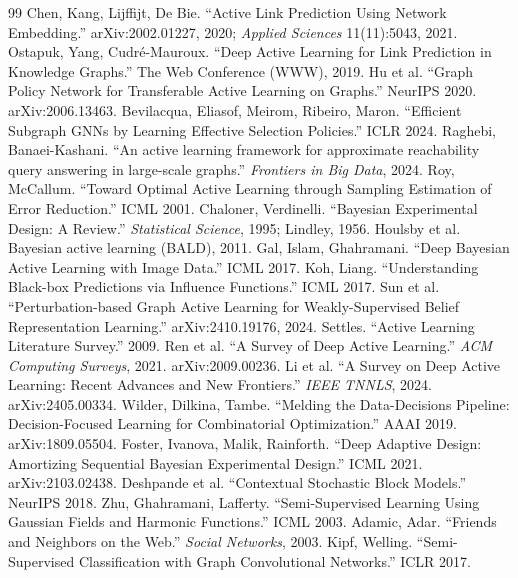 \documentclass[11pt,a4paper]{article}
\newif\ifshowverify
\newcommand{\verify}{\ifshowverify\textcolor{red}{\textsuperscript{[verify]}}\fi}
\begin{document}
\begin{thebibliography}{99}
\small
{} Chen, Kang, Lijffijt, De Bie. ``Active Link Prediction Using Network
Embedding.'' arXiv:2002.01227, 2020; \emph{Applied Sciences} 11(11):5043, 2021.
 Ostapuk, Yang, Cudr\'e-Mauroux. ``Deep Active Learning for Link
Prediction in Knowledge Graphs.'' The Web Conference (WWW), 2019.
 Hu et al. ``Graph Policy Network for Transferable Active Learning on Graphs.''
NeurIPS 2020. arXiv:2006.13463.
 Bevilacqua, Eliasof, Meirom, Ribeiro, Maron. ``Efficient Subgraph GNNs by
Learning Effective Selection Policies.'' ICLR 2024.
 Raghebi, Banaei-Kashani. ``An active learning framework for approximate
reachability query answering in large-scale graphs.'' \emph{Frontiers in Big Data}, 2024.
 Roy, McCallum. ``Toward Optimal Active Learning through Sampling Estimation of
Error Reduction.'' ICML 2001.\verify
{} Chaloner, Verdinelli. ``Bayesian Experimental Design: A Review.''
\emph{Statistical Science}, 1995; Lindley, 1956.
 Houlsby et al. Bayesian active learning (BALD), 2011.\verify
{} Gal, Islam, Ghahramani. ``Deep Bayesian Active Learning with Image Data.''
ICML 2017.
 Koh, Liang. ``Understanding Black-box Predictions via Influence Functions.''
ICML 2017.
 Sun et al. ``Perturbation-based Graph Active Learning for Weakly-Supervised
Belief Representation Learning.'' arXiv:2410.19176, 2024.
 Settles. ``Active Learning Literature Survey.'' 2009.
 Ren et al. ``A Survey of Deep Active Learning.'' \emph{ACM Computing Surveys},
2021. arXiv:2009.00236.
 Li et al. ``A Survey on Deep Active Learning: Recent Advances and New Frontiers.''
\emph{IEEE TNNLS}, 2024. arXiv:2405.00334.
 Wilder, Dilkina, Tambe. ``Melding the Data-Decisions Pipeline:
Decision-Focused Learning for Combinatorial Optimization.'' AAAI 2019. arXiv:1809.05504.
 Foster, Ivanova, Malik, Rainforth. ``Deep Adaptive Design: Amortizing
Sequential Bayesian Experimental Design.'' ICML 2021. arXiv:2103.02438.
 Deshpande et al. ``Contextual Stochastic Block Models.'' NeurIPS 2018.\verify
{} Zhu, Ghahramani, Lafferty. ``Semi-Supervised Learning Using Gaussian Fields and
Harmonic Functions.'' ICML 2003.\verify
{} Adamic, Adar. ``Friends and Neighbors on the Web.'' \emph{Social Networks},
2003.\verify
{} Kipf, Welling. ``Semi-Supervised Classification with Graph Convolutional
Networks.'' ICLR 2017.\verify
\end{thebibliography}
\end{document}
